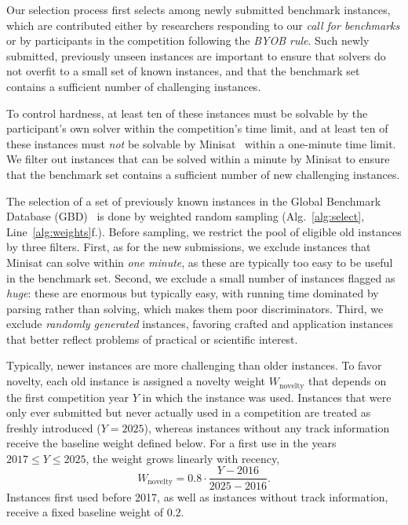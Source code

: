 \documentclass[conference]{IEEEtran}
\begin{document}
Our selection process first selects among newly submitted benchmark instances, which are contributed either by researchers responding to our \emph{call for benchmarks} or by participants in the competition following the \emph{BYOB rule}.
Such newly submitted, previously unseen instances are important to ensure that solvers do not overfit to a small set of known instances, and that the benchmark set contains a sufficient number of challenging instances.

To control hardness, at least ten of these instances must be solvable by the participant's own solver within the competition's time limit, and at least ten of these instances must \emph{not} be solvable by Minisat~\cite{minisat} within a one-minute time limit.
We filter out instances that can be solved within a minute by Minisat to ensure that the benchmark set contains a sufficient number of new challenging instances.

The selection of a set of previously known instances in the Global Benchmark Database (GBD)~\cite{gbdsatpaper} is done by weighted random sampling (Alg.~\ref{alg:select}, Line~\ref{alg:weights}f.).
Before sampling, we restrict the pool of eligible old instances by three filters.
First, as for the new submissions, we exclude instances that Minisat can solve within \emph{one minute}, as these are typically too easy to be useful in the benchmark set.
Second, we exclude a small number of instances flagged as \emph{huge}: these are enormous but typically easy, with running time dominated by parsing rather than solving, which makes them poor discriminators.
Third, we exclude \emph{randomly generated} instances, favoring crafted and application instances that better reflect problems of practical or scientific interest.

Typically, newer instances are more challenging than older instances.
To favor novelty, each old instance is assigned a novelty weight $W_\text{novelty}$ that depends on the first competition year $Y$ in which the instance was used.
Instances that were only ever submitted but never actually used in a competition are treated as freshly introduced ($Y = 2025$), whereas instances without any track information receive the baseline weight defined below.
For a first use in the years $2017 \le Y \le 2025$, the weight grows linearly with recency,
\[
W_\text{novelty} = 0.8 \cdot \frac{Y - 2016}{2025 - 2016}.
\]
Instances first used before 2017, as well as instances without track information, receive a fixed baseline weight of $0.2$.
\end{document}
